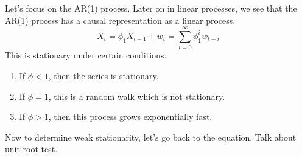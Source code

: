 \documentclass{article}
\begin{document}
  \begin{example}[AR(1) Processes]
    Let's focus on the AR(1) process. Later on in linear processes, we see that the AR(1) process has a causal representation as a linear process. 
    \begin{equation}
      X_t = \phi_1 X_{t-1} + w_t = \sum_{i=0}^\infty \phi_1^i w_{t-i}
    \end{equation}
    This is stationary under certain conditions. 
    \begin{enumerate}
      \item If $\phi < 1$, then the series is stationary. 
      \item If $\phi = 1$, this is a random walk which is not stationary. 
      \item If $\phi > 1$, then this process grows exponentially fast. 
    \end{enumerate}
  \end{example}

  Now to determine weak stationarity, let's go back to the equation. Talk about unit root test. 
\end{document}
